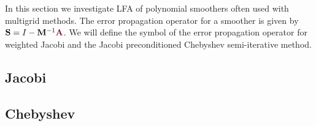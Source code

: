 In this section we investigate LFA of polynomial smoothers often used with multigrid methods.
The error propagation operator for a smoother is given by $\mathbf{S} = I - \mathbf{M}^{-1} {\color{burgundy}\mathbf{A}}$.
We will define the symbol of the error propagation operator for weighted Jacobi and the Jacobi preconditioned Chebyshev semi-iterative method.

\subsection{Jacobi}


\subsection{Chebyshev}

